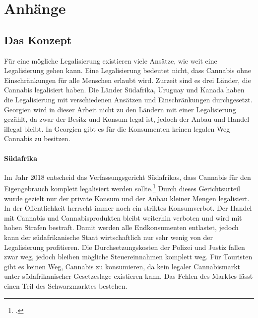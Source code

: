 \documentclass[../main.tex]{subfiles}
\begin{document}
	\section*{Anhänge}
	
	\subsection{Das Konzept}
	 Für eine mögliche Legalisierung existieren viele Ansätze, wie weit eine Legalisierung gehen kann.
	 Eine Legalisierung bedeutet nicht, dass Cannabis ohne Einschränkungen für alle Menschen erlaubt wird.
	 Zurzeit sind es drei Länder, die Cannabis legalisiert haben.
	 Die Länder Südafrika, Uruguay und Kanada haben die Legalisierung mit verschiedenen Ansätzen und Einschränkungen durchgesetzt.
	 Georgien wird in dieser Arbeit nicht zu den Ländern mit einer Legalisierung gezählt, da zwar der Besitz und Konsum legal ist, jedoch der Anbau und Handel illegal bleibt. 
	 In Georgien gibt es für die Konsumenten keinen legalen Weg Cannabis zu besitzen.
	 
	 \paragraph{Südafrika}
	 Im Jahr 2018 entscheid das Verfassungsgericht Südafrikas, dass Cannabis für den Eigengebrauch komplett legalisiert werden sollte.\footcite{zacc} 
	 Durch dieses Gerichtsurteil wurde gezielt nur der private Konsum und der Anbau kleiner Mengen legalisiert. 
	 In der Öffentlichkeit herrscht immer noch ein striktes Konsumverbot. 
	 Der Handel mit Cannabis und Cannabisprodukten bleibt weiterhin verboten und wird mit hohen Strafen bestraft. 
	 Damit werden alle Endkonsumenten entlastet, jedoch kann der südafrikanische Staat wirtschaftlich nur sehr wenig von der Legalisierung profitieren. 
	 Die Durchsetzungskosten der Polizei und Justiz fallen zwar weg, jedoch bleiben mögliche Steuereinnahmen komplett weg.
	 Für Touristen gibt es keinen Weg, Cannabis zu konsumieren, da kein legaler Cannabismarkt unter südafrikanischer Gesetzeslage existieren kann.
	 Das Fehlen des Marktes lässt einen Teil des Schwarzmarktes bestehen.
	 
\end{document}
